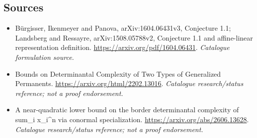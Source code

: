 \documentclass[11pt,a4paper]{article}
\numberwithin{equation}{section}
\begin{document}
\subsection{Sources}
\begin{itemize}\raggedright
\item[\textnormal{[S1]}]\hypertarget{source:57:1}{} Bürgisser, Ikenmeyer and Panova, arXiv:1604.06431v3, Conjecture 1.1; Landsberg and Ressayre, arXiv:1508.05788v2, Conjecture 1.1 and affine-linear representation definition.
\url{https://arxiv.org/pdf/1604.06431}.
{\small\textit{Catalogue formulation source.}}
\item[\textnormal{[S2]}]\hypertarget{source:57:2}{} Bounds on Determinantal Complexity of Two Types of Generalized Permanents.
\url{https://arxiv.org/html/2202.13016}.
{\small\textit{Catalogue research/status reference; not a proof endorsement.}}
\item[\textnormal{[S3]}]\hypertarget{source:57:3}{} A near-quadratic lower bound on the border determinantal complexity of sum\_i x\_i\textasciicircum{}n via conormal specialization.
\url{https://arxiv.org/abs/2606.13628}.
{\small\textit{Catalogue research/status reference; not a proof endorsement.}}


\end{itemize}
\end{document}
